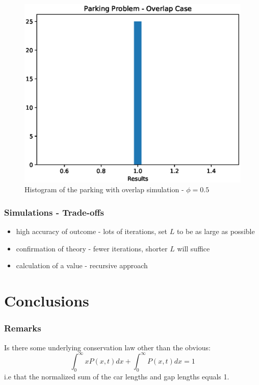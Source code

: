 \documentclass{beamer}
\begin{document}
\begin{frame}
    \begin{figure}
    	\centering
    	\includegraphics[scale = 0.5]{parking_simulation_07.eps}
    	\caption{Histogram of the parking with overlap simulation - $\phi = 0.5$}
    \end{figure}
\end{frame}

\begin{frame}
    \frametitle{Simulations - Trade-offs}
	\begin{itemize}
		\item high accuracy of outcome - lots of iterations, set $L$ to be as large as possible
		\item confirmation of theory - fewer iterations, shorter $L$ will suffice
		\item calculation of a value - recursive approach
	\end{itemize}\medskip
\end{frame}




\section{Conclusions}
\begin{frame}
	\frametitle{Remarks}
	Is there some underlying conservation law other than the obvious:
	\[
		\int_{0}^{\infty} x P(x, t) dx + \int_{0}^{\infty} P(x, t) dx = 1
	\]
	i.e that the normalized sum of the car lengths and gap lengths equals 1. 
\end{frame}
\end{document}
